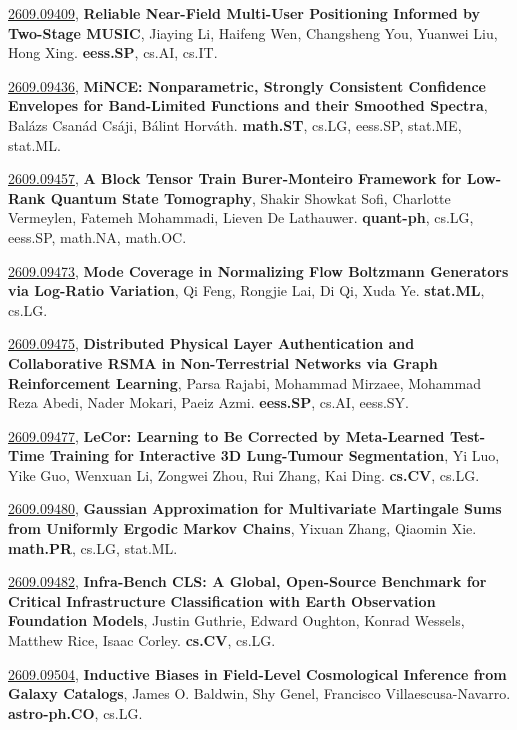 \documentclass[9pt, a4paper]{article}
\theoremstyle{plain}
\theoremstyle{definition}
\theoremstyle{remark}
\newcommand{\arxivwithtarget}[3]{\hypertarget{#1}{}\href{https://arxiv.org/abs/#1}{#1}, \textbf{\textcolor{arxivblue}{#2}}, #3. }
\begin{document}
\arxivwithtarget{2609.09409}{Reliable Near-Field Multi-User Positioning Informed by Two-Stage MUSIC}{Jiaying Li, Haifeng Wen, Changsheng You, Yuanwei Liu, Hong Xing}\textbf{eess.SP}, cs.AI, cs.IT.



\arxivwithtarget{2609.09436}{MiNCE: Nonparametric, Strongly Consistent Confidence Envelopes for Band-Limited Functions and their Smoothed Spectra}{Balázs Csanád Csáji, Bálint Horváth}\textbf{math.ST}, cs.LG, eess.SP, stat.ME, stat.ML.



\arxivwithtarget{2609.09457}{A Block Tensor Train Burer-Monteiro Framework for Low-Rank Quantum State Tomography}{Shakir Showkat Sofi, Charlotte Vermeylen, Fatemeh Mohammadi, Lieven De Lathauwer}\textbf{quant-ph}, cs.LG, eess.SP, math.NA, math.OC.



\arxivwithtarget{2609.09473}{Mode Coverage in Normalizing Flow Boltzmann Generators via Log-Ratio Variation}{Qi Feng, Rongjie Lai, Di Qi, Xuda Ye}\textbf{stat.ML}, cs.LG.



\arxivwithtarget{2609.09475}{Distributed Physical Layer Authentication and Collaborative RSMA in Non-Terrestrial Networks via Graph Reinforcement Learning}{Parsa Rajabi, Mohammad Mirzaee, Mohammad Reza Abedi, Nader Mokari, Paeiz Azmi}\textbf{eess.SP}, cs.AI, eess.SY.



\arxivwithtarget{2609.09477}{LeCor: Learning to Be Corrected by Meta-Learned Test-Time Training for Interactive 3D Lung-Tumour Segmentation}{Yi Luo, Yike Guo, Wenxuan Li, Zongwei Zhou, Rui Zhang, Kai Ding}\textbf{cs.CV}, cs.LG.



\arxivwithtarget{2609.09480}{Gaussian Approximation for Multivariate Martingale Sums from Uniformly Ergodic Markov Chains}{Yixuan Zhang, Qiaomin Xie}\textbf{math.PR}, cs.LG, stat.ML.



\arxivwithtarget{2609.09482}{Infra-Bench CLS: A Global, Open-Source Benchmark for Critical Infrastructure Classification with Earth Observation Foundation Models}{Justin Guthrie, Edward Oughton, Konrad Wessels, Matthew Rice, Isaac Corley}\textbf{cs.CV}, cs.LG.



\arxivwithtarget{2609.09504}{Inductive Biases in Field-Level Cosmological Inference from Galaxy Catalogs}{James O. Baldwin, Shy Genel, Francisco Villaescusa-Navarro}\textbf{astro-ph.CO}, cs.LG.
\end{document}

